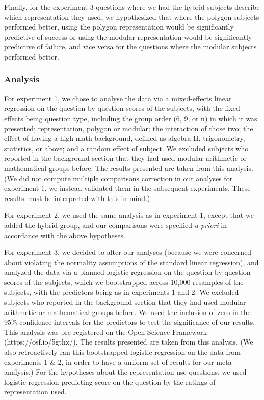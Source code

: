 \documentclass[man,10pt]{apa6}
\begin{document}
Finally, for the experiment 3 questions where we had the hybrid subjects describe which representation they used, we hypothesized that where the polygon subjects performed better, using the polygon representation would be significantly predictive of success or using the modular representation would be significantly predictive of failure, and vice versa for the questions where the modular subjects performed better.
\subsubsection{Analysis}
For experiment 1, we chose to analyse the data via a mixed-effects linear regression on the question-by-question scores of the subjects, with the fixed effects being question type, including the group order (6, 9, or n) in which it was presented; representation, polygon or modular; the interaction of those two; the effect of having a high math background, defined as algebra II, trigonometry, statistics, or above; and a random effect of subject. We excluded subjects who reported in the background section that they had used modular arithmetic or mathematical groups before. The results presented are taken from this analysis. (We did not compute multiple comparisons correction in our analyses for experiment 1, we instead validated them in the subsequent experiments. These results must be interpreted with this in mind.) \par 
For experiment 2, we used the same analysis as in experiment 1, except that we added the hybrid group, and our comparisons were specified \textit{a priori} in accordance with the above hypotheses.\par
For experiment 3, we decided to alter our analyses (because we were concerned about violating the normality assumptions of the standard linear regression), and analyzed the data via a planned logistic regression on the question-by-question scores of the subjects, which we bootstrapped across 10,000 resamples of the subjects, with the predictors being as in experiments 1 and 2. We excluded subjects who reported in the background section that they had used modular arithmetic or mathematical groups before. We used the inclusion of zero in the 95\% confidence intervals for the predictors to test the significance of our results. This analysis was pre-registered on the Open Science Framework (https://osf.io/5gthx/). The results presented are taken from this analysis. (We also retroactively ran this bootstrapped logistic regression on the data from experiments 1 \& 2, in order to have a uniform set of results for our meta-analysis.) For the hypotheses about the representation-use questions, we used logistic regression predicting score on the question by the ratings of representation used.
\end{document}
